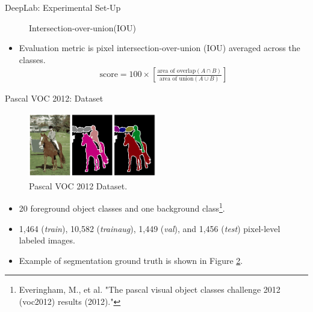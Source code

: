\documentclass{beamer}
\begin{document}
\begin{frame}{DeepLab: Experimental Set-Up }
	\vspace{-0.5cm}
\begin{figure}
	\centering
	\caption{Intersection-over-union(IOU) } \label{fig:M1}
\end{figure}
\vspace{-0.5cm}
\begin{itemize}
	\item Evaluation metric is pixel intersection-over-union ({\color{blue}IOU}) averaged across the classes.
\begin{align*}
	\text{score} = 100\times\left[ \frac{\text{area of overlap}(A\cap B)}{\text{area of union}(A\cup B)}\right] 
\end{align*}
\end{itemize}

\end{frame}
\begin{frame}{Pascal VOC 2012: Dataset}
\begin{figure}
	\centering
	\includegraphics[width=0.50\textwidth]{figure/ss36.png}
	\captionsetup{justification=centering}
	\caption{Pascal VOC 2012 Dataset.}
	\label{fig:M5}
\end{figure}
\vspace{-0.5cm}
\begin{itemize}
	\item 20 foreground object classes and one background class\footnote{Everingham, M., et al. "The pascal visual object classes challenge 2012\\ (voc2012) results (2012)."}.
	\item {\color{blue}1,464} (\textit{train}), {\color{blue}10,582} (\textit{trainaug}),  {\color{blue}1,449} (\textit{val}), and  {\color{blue}1,456} (\textit{test}) pixel-level labeled images.
	\item Example of segmentation ground truth is shown in {\color{blue}Figure \ref{fig:M5}}.
\end{itemize}
\end{frame}
\end{document}
